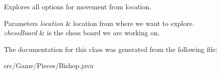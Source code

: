 Explores all options for movement from location. 
\begin{DoxyParams}{Parameters}
{\em location} & location from where we want to explore. \\
\hline
{\em chess\+Board} & is the chess board we are working on. \\
\hline
\end{DoxyParams}


The documentation for this class was generated from the following file\+:\begin{DoxyCompactItemize}
\item 
src/\+Game/\+Pieces/Bishop.\+java\end{DoxyCompactItemize}
